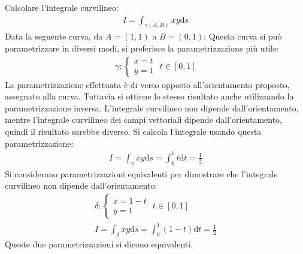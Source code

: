 \documentclass{article}
\newcommand{\df}{\mathrm{d}}
\numberwithin{equation}{subsection}
\begin{document}
Calcolare l'integrale curvilineo:
\begin{gather*}
    I=\int_{\gamma(A,B)}xy\df s
\end{gather*}
Data la seguente curva, da $A=(1,1)$ a $B=(0,1)$:
Questa curva si può parametrizzare in diversi modi, si preferisce la parametrizzazione più utile:
\begin{gather*}
    \gamma:\begin{cases}
        x=t\\y=1
    \end{cases}\,\, t\in[0,1]
\end{gather*}
La parametrizzazione effettuata è di verso opposto all'orientamento proposto, assegnato alla curva. Tuttavia si ottiene lo stesso risultato anche utilizzando la parametrizzazione inversa. L'integrale curvilineo non dipende dall'orientamento, mentre l'integrale curvilineo dei campi vettoriali dipende dall'orientamento, quindi il risultato sarebbe diverso. 
Si calcola l'integrale usando questa parametrizzazione:
\begin{gather*}
    I=\int_{\gamma}xy\df s=\int_0^1t\df t=\frac{1}{2}
\end{gather*}
Si considerano parametrizzazioni equivalenti per dimostrare che l'integrale curvilineo non dipende dall'orientamento:
\begin{gather*}
    \delta:\begin{cases}
        x=1-t\\y=1
    \end{cases}\,\,t\in[0,1]\\
    I=\int_{\delta}xy\df s=\int_0^1(1-t)\df t=\frac{1}{2}
\end{gather*}
Queste due parametrizzazioni si dicono equivalenti. 
\end{document}
